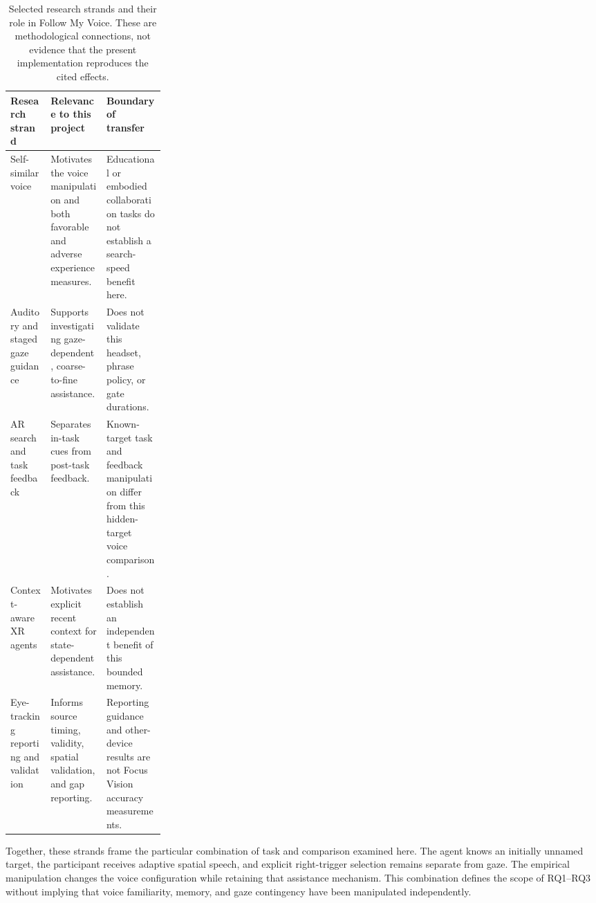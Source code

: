 \begin{table}[htbp]\centering
\caption[Related research and boundaries of transfer]{Selected research strands and their role in Follow My Voice. These are methodological connections, not evidence that the present implementation reproduces the cited effects.}
\label{tab:related-work-map}
\small{}
\begin{tabularx}{\linewidth}{@{}p{0.26\linewidth}XX@{}}\toprule
Research strand & Relevance to this project & Boundary of transfer \\\midrule
Self-similar voice~\cite{kao2021selfsimilar,guo2024doppelganger} & Motivates the voice manipulation and both favorable and adverse experience measures. & Educational or embodied collaboration tasks do not establish a search-speed benefit here. \\
Auditory and staged gaze guidance~\cite{losing2014guiding,kwok2022twostep} & Supports investigating gaze-dependent, coarse-to-fine assistance. & Does not validate this headset, phrase policy, or gate durations. \\
AR search and task feedback~\cite{zhang2023seehear} & Separates in-task cues from post-task feedback. & Known-target task and feedback manipulation differ from this hidden-target voice comparison. \\
Context-aware XR agents~\cite{bovo2025embardiment} & Motivates explicit recent context for state-dependent assistance. & Does not establish an independent benefit of this bounded memory. \\
Eye-tracking reporting and validation~\cite{dunn2024reporting,niehorster2026dataquality,adhanom2020gazemetrics} & Informs source timing, validity, spatial validation, and gap reporting. & Reporting guidance and other-device results are not Focus Vision accuracy measurements. \\\bottomrule
\end{tabularx}
\end{table}

Together, these strands frame the particular combination of task and comparison examined here. The agent knows an initially unnamed target, the participant receives adaptive spatial speech, and explicit right-trigger selection remains separate from gaze. The empirical manipulation changes the voice configuration while retaining that assistance mechanism. This combination defines the scope of RQ1--RQ3 without implying that voice familiarity, memory, and gaze contingency have been manipulated independently.

